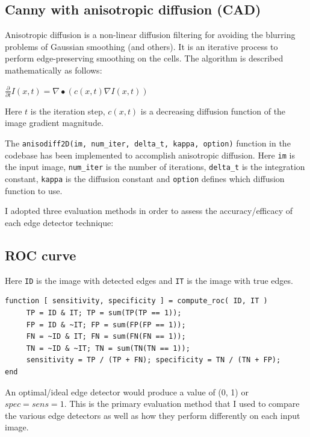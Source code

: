 \documentclass{article}
\begin{document}
	\subsection*{Canny with anisotropic diffusion (CAD)}	
	
	Anisotropic diffusion is a non-linear diffusion filtering for avoiding the
	blurring problems of Gaussian smoothing (and others). It is an iterative
	process to perform edge-preserving smoothing on the cells.
	The algorithm is described mathematically as follows:
	
	\begin{center}
	$\frac{\partial}{\partial t}I(x, t) = \nabla \bullet (c(x, t) \nabla I(x, t))$
	\end{center}		
	
	Here $t$ is the iteration step, $c(x, t)$ is a decreasing diffusion function
	of the image gradient magnitude.
	
	The \verb|anisodiff2D(im, num_iter, delta_t, kappa, option)| function in the codebase
	has been implemented to accomplish anisotropic diffusion. Here \verb|im| is the
	input image, \verb|num_iter| is the number of iterations, \verb|delta_t| is
	the integration constant, \verb|kappa| is the diffusion constant and
	\verb|option| defines which diffusion function to use.
	\newline
	
	I adopted three evaluation methods in order to assess the accuracy/efficacy of each edge
	detector technique:
	
	\subsection*{ROC curve}
	
	Here \verb|ID| is the image with detected edges and \verb|IT| is the image with
	true edges.	
	
\begin{verbatim}
function [ sensitivity, specificity ] = compute_roc( ID, IT )
     TP = ID & IT; TP = sum(TP(TP == 1));
     FP = ID & ~IT; FP = sum(FP(FP == 1));
     FN = ~ID & IT; FN = sum(FN(FN == 1));
     TN = ~ID & ~IT; TN = sum(TN(TN == 1));
     sensitivity = TP / (TP + FN); specificity = TN / (TN + FP);
end
\end{verbatim}

	An optimal/ideal edge detector would produce a value of (0, 1) or $spec = sens = 1$.
	This is the primary evaluation method that I used to compare the various edge
	detectors as well as how they perform differently on each input image.
	
\end{document}
